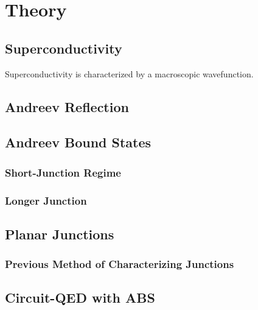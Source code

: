 \section{Theory}

\subsection{Superconductivity}
Superconductivity is characterized by a macroscopic wavefunction. 

\subsection{Andreev Reflection}

\subsection{Andreev Bound States}

\subsubsection{Short-Junction Regime}

\subsubsection{Longer Junction}


\subsection{Planar Junctions}

\subsubsection{Previous Method of Characterizing Junctions}

\subsection{Circuit-QED with ABS}


